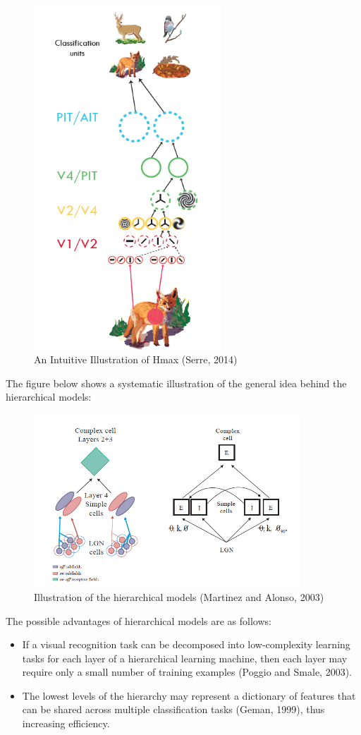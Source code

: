 \begin{figure}[H]
\centering
    \includegraphics[width=7cm]{figures/models/hmax.png}
     \caption{An Intuitive Illustration of Hmax (Serre, 2014)}
\end{figure}

\par The figure below shows a systematic illustration of the general idea behind the hierarchical models:
\begin{figure}[H]
\centering
    \includegraphics[width=10cm]{figures/models/hierarchical-models.png}
     \caption{Illustration of the hierarchical models (Martinez and Alonso, 2003)}
\end{figure}

\par The possible advantages of hierarchical models are as follows:
\begin{itemize}
    \item If a visual recognition task can be decomposed into low-complexity learning tasks for each layer of a hierarchical learning machine, then each layer may require only a small number of training examples (Poggio and Smale, 2003).
    \item The lowest levels of the hierarchy may represent a dictionary of features that can be shared across multiple classification tasks (Geman, 1999), thus increasing efficiency.
\end{itemize}

